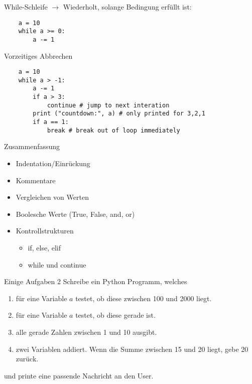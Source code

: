 \begin{frame}[fragile]{While-Schleife}
    $\rightarrow$ Wiederholt, solange Bedingung erfüllt ist:
    \begin{lstlisting}
    a = 10
    while a >= 0:
        a -= 1
    \end{lstlisting}
\end{frame}

\begin{frame}[fragile]{Vorzeitiges Abbrechen} 
    \begin{lstlisting}
    a = 10
    while a > -1:
        a -= 1
        if a > 3:
            continue # jump to next interation
        print ("countdown:", a) # only printed for 3,2,1
        if a == 1:
            break # break out of loop immediately
    \end{lstlisting}
\end{frame}

\begin{frame}{Zusammenfassung}
	\begin{itemize}
		\item Indentation/Einrückung
		\item Kommentare
		\item Vergleichen von Werten
		\item Boolesche Werte (True, False, and, or)
		\item Kontrollstrukturen
		\begin{itemize}
			\item if, else, elif
			\item while und continue
		\end{itemize}
	\end{itemize}
\end{frame}

\begin{frame}{Einige Aufgaben 2}
	Schreibe ein Python Programm, welches
	\begin{enumerate}
		\item für eine Variable $a$ testet, ob diese zwischen 100 und 2000 liegt.
		\item für eine Variable $a$ testet, ob diese gerade ist.
		\item alle gerade Zahlen zwischen 1 und 10 ausgibt.
		\item zwei Variablen addiert. Wenn die Summe zwischen 15 und 20 liegt, gebe 20 zurück.
	\end{enumerate}
	und printe eine passende Nachricht an den User.
\end{frame}

